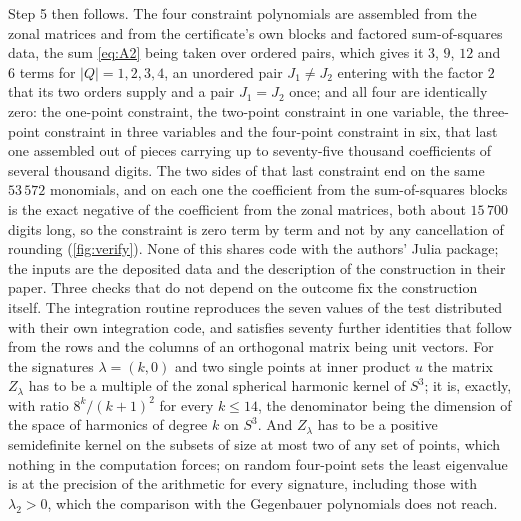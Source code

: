 \documentclass[11pt,reqno]{amsart}
\renewcommand{\_}{\origunderscore\allowbreak}
\numberwithin{equation}{section}
\theoremstyle{plain}
\theoremstyle{definition}
\theoremstyle{remark}
\begin{document}
Step 5 then follows. The four constraint polynomials are assembled from the
zonal matrices and from the certificate's own blocks and factored
sum-of-squares data, the sum \eqref{eq:A2} being taken over ordered
pairs, which gives it $3$, $9$, $12$ and $6$ terms for $|Q|=1,2,3,4$,
an unordered pair $J_1\ne J_2$ entering with the factor $2$ that its two
orders supply and a pair $J_1=J_2$ once; and all four are identically
zero: the one-point
constraint, the two-point constraint in one variable, the three-point
constraint in three variables and the four-point constraint in six, that last
one assembled out of pieces carrying up to seventy-five thousand coefficients
of several thousand digits. The two sides of that last constraint end on the
same $53\,572$ monomials, and on each one the coefficient from the
sum-of-squares blocks is the exact negative of the coefficient from the zonal
matrices, both about $15\,700$ digits long, so the constraint is zero term by
term and not by any cancellation of rounding (\cref{fig:verify}).
None of this shares code with the authors' Julia package; the inputs are the
deposited data and the description of the construction in their paper. Three
checks that do not depend on the outcome fix the construction itself. The
integration routine reproduces the seven values of the test distributed with
their own integration code, and satisfies seventy further identities that
follow from the rows and the columns of an orthogonal matrix being unit
vectors. For the signatures $\lambda=(k,0)$ and two single points at inner
product $u$ the matrix $Z_\lambda$ has to be a multiple of the zonal spherical
harmonic kernel of $S^3$; it is, exactly, with ratio $8^k/(k+1)^2$ for every
$k\le14$, the denominator being the dimension of the space of harmonics of
degree $k$ on $S^3$. And $Z_\lambda$ has to be a positive semidefinite kernel
on the subsets of size at most two of any set of points, which nothing in the
computation forces; on random four-point sets the least eigenvalue is at the
precision of the arithmetic for every signature, including those with
$\lambda_2>0$, which the comparison with the Gegenbauer polynomials does not
reach.
\end{document}
